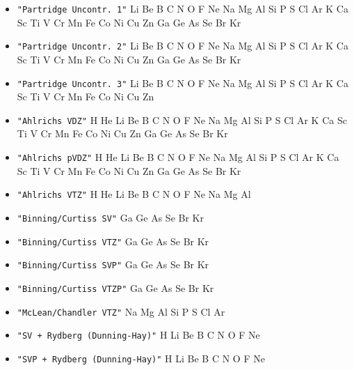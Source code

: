 \begin{itemize}
\item \verb#"Partridge Uncontr. 1"# \newline
 Li Be B C N O F Ne Na Mg Al Si P S Cl Ar K Ca Sc Ti V Cr Mn Fe Co Ni Cu
 Zn Ga Ge As Se Br Kr

\item \verb#"Partridge Uncontr. 2"# \newline
 Li Be B C N O F Ne Na Mg Al Si P S Cl Ar K Ca Sc Ti V Cr Mn Fe Co Ni Cu
 Zn Ga Ge As Se Br Kr

\item \verb#"Partridge Uncontr. 3"# \newline
 Li Be B C N O F Ne Na Mg Al Si P S Cl Ar K Ca Sc Ti V Cr Mn Fe Co Ni Cu
 Zn

\item \verb#"Ahlrichs VDZ"# \newline
 H He Li Be B C N O F Ne Na Mg Al Si P S Cl Ar K Ca Sc Ti V Cr Mn Fe Co
 Ni Cu Zn Ga Ge As Se Br Kr

\item \verb#"Ahlrichs pVDZ"# \newline
 H He Li Be B C N O F Ne Na Mg Al Si P S Cl Ar K Ca Sc Ti V Cr Mn Fe Co
 Ni Cu Zn Ga Ge As Se Br Kr

\item \verb#"Ahlrichs VTZ"# \newline
 H He Li Be B C N O F Ne Na Mg Al

\item \verb#"Binning/Curtiss SV"# \newline
 Ga Ge As Se Br Kr

\item \verb#"Binning/Curtiss VTZ"# \newline
 Ga Ge As Se Br Kr

\item \verb#"Binning/Curtiss SVP"# \newline
 Ga Ge As Se Br Kr

\item \verb#"Binning/Curtiss VTZP"# \newline
 Ga Ge As Se Br Kr

\item \verb#"McLean/Chandler VTZ"# \newline
 Na Mg Al Si P S Cl Ar

\item \verb#"SV + Rydberg (Dunning-Hay)"# \newline
 H Li Be B C N O F Ne

\item \verb#"SVP + Rydberg (Dunning-Hay)"# \newline
 H Li Be B C N O F Ne


\end{itemize}
